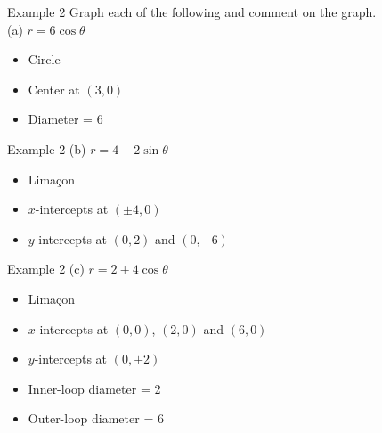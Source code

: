 \documentclass[t,usenames,dvipsnames]{beamer}
\begin{document}
\begin{frame}{Example 2}
Graph each of the following and comment on the graph.   \newline\\
(a) \quad $r = 6\cos\theta$ \newline\\  \pause
\begin{itemize}
    \item Circle    \newline\\  \pause
    \item Center at $(3,0)$ \newline\\  \pause
    \item Diameter = 6
\end{itemize}
\end{frame}

\begin{frame}{Example 2}
(b) \quad $r = 4 - 2\sin\theta$ \newline\\  \pause
\begin{itemize}
    \item Lima\c{c}on  \newline\\  \pause
    \item $x$-intercepts at $(\pm 4,0)$ \newline\\  \pause
    \item $y$-intercepts at $(0,2)$ and $(0,-6)$
\end{itemize}
\end{frame}

\begin{frame}{Example 2}
(c) \quad $r = 2 + 4\cos\theta$ \newline\\  \pause
\begin{itemize}
    \item Lima\c{c}on \newline\\ \pause
    \item $x$-intercepts at $(0,0)$, $(2,0)$ and $(6,0)$ \newline\\ \pause
    \item $y$-intercepts at $(0, \pm 2)$    \newline\\ \pause
    \item Inner-loop diameter = 2   \newline\\  \pause
    \item Outer-loop diameter = 6
\end{itemize}
\end{frame}
\end{document}
